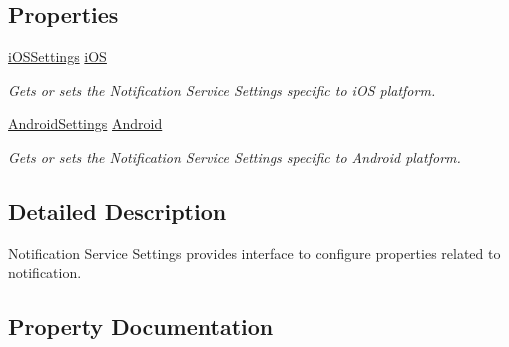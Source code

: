 \subsection*{Properties}
\begin{DoxyCompactItemize}
\item 
\hyperlink{class_voxel_busters_1_1_native_plugins_1_1_notification_service_settings_1_1i_o_s_settings}{i\+O\+S\+Settings} \hyperlink{class_voxel_busters_1_1_native_plugins_1_1_notification_service_settings_a3bf35f819c6fe2c2806c637c02127ff8}{i\+O\+S}
\begin{DoxyCompactList}\small\item\em Gets or sets the Notification Service Settings specific to i\+O\+S platform. \end{DoxyCompactList}\item 
\hyperlink{class_voxel_busters_1_1_native_plugins_1_1_notification_service_settings_1_1_android_settings}{Android\+Settings} \hyperlink{class_voxel_busters_1_1_native_plugins_1_1_notification_service_settings_a1c2d6ed884eda0a6f3e7bb4913332b0a}{Android}
\begin{DoxyCompactList}\small\item\em Gets or sets the Notification Service Settings specific to Android platform. \end{DoxyCompactList}\end{DoxyCompactItemize}


\subsection{Detailed Description}
Notification Service Settings provides interface to configure properties related to notification. 



\subsection{Property Documentation}
\hypertarget{class_voxel_busters_1_1_native_plugins_1_1_notification_service_settings_a3bf35f819c6fe2c2806c637c02127ff8}{}
